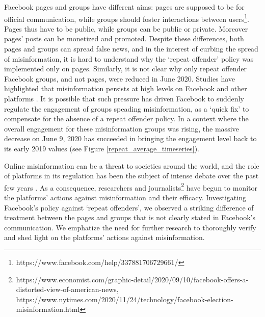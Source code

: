 \documentclass[11pt,a4paper]{article}
\begin{document}
Facebook pages and groups have different aims: pages are supposed to be for official communication, while groups should foster interactions between users\footnote{https://www.facebook.com/help/337881706729661/}. 
Pages thus have to be public, while groups can be public or private. 
Moreover pages' posts can be monetized and promoted. 
Despite these differences, both pages and groups can spread false news, and in the interest of curbing the spread of misinformation, it is hard to understand why the `repeat offender' policy was implemented only on pages. 
Similarly, it is not clear why only repeat offender Facebook groups, and not pages, were reduced in June 2020.
Studies have highlighted that misinformation persists at high levels on Facebook and other platforms \citep{kornbluh2020new, resnick2018iffy}. 
It is possible that such pressure has driven Facebook to suddenly regulate the engagement of groups speading misinformation, as a `quick fix' to compensate for the absence of a repeat offender policy.
In a context where the overall engagement for these misinformation groups was rising, the massive decrease on June 9, 2020 has succeeded in bringing the engagement level back to its early 2019 values (see Figure \ref{repeat_average_timeseries}).

Online misinformation can be a threat to societies around the world, and the role of platforms in its regulation has been the subject of intense debate over the past few years \citep{rogers2020deplatforming, de2020internet}. 
As a consequence, researchers \citep{mena2020cleaning, yaqub2020effects} and journalists\footnote{https://www.economist.com/graphic-detail/2020/09/10/facebook-offers-a-distorted-view-of-american-news, https://www.nytimes.com/2020/11/24/technology/facebook-election-misinformation.html} have begun to monitor the platforms' actions against misinformation and their efficacy. 
Investigating Facebook's policy against `repeat offenders', we observed a striking difference of treatment between the pages and groups that is not clearly stated in Facebook's communication. 
We emphatize the need for further research to thoroughly verify and shed light on the platforms' actions against misinformation.
 


\end{document}
